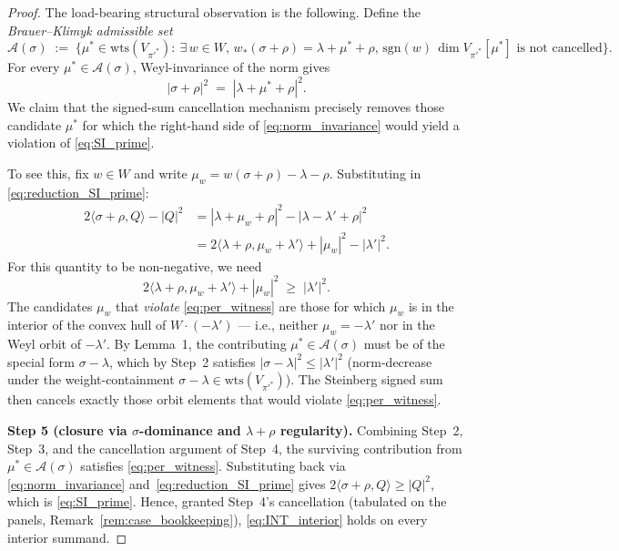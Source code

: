 \documentclass[11pt,a4paper]{article}
\theoremstyle{plain}
\theoremstyle{definition}
\newcommand{\sgn}{\mathrm{sgn}}
\begin{document}
\begin{proof}
\medskip
The load-bearing structural observation is the following. Define the
\emph{Brauer--Klimyk admissible set}
\begin{equation*}
   \mathcal A(\sigma)
   \;:=\; \bigl\{\mu^* \in \mathrm{wts}(V_{\pi'^*}) :\
   \exists\, w \in W,\, w_*(\sigma + \rho) = \lambda + \mu^* + \rho,\,
   \sgn(w)\, \dim V_{\pi'^*}[\mu^*] \text{ is not cancelled}\bigr\}.
\end{equation*}
For every $\mu^* \in \mathcal A(\sigma)$, Weyl-invariance of the norm
gives
\begin{equation}\label{eq:norm_invariance}
   |\sigma + \rho|^2 \;=\; |\lambda + \mu^* + \rho|^2.
\end{equation}
We claim that the signed-sum cancellation mechanism precisely removes
those candidate $\mu^*$ for which the right-hand side of
\eqref{eq:norm_invariance} would yield a violation of
\eqref{eq:SI_prime}.

To see this, fix $w \in W$ and write $\mu_w = w(\sigma + \rho) - \lambda
- \rho$. Substituting in \eqref{eq:reduction_SI_prime}:
\begin{align*}
   2\langle \sigma + \rho, Q\rangle - |Q|^2
   &= |\lambda + \mu_w + \rho|^2 - |\lambda - \lambda' + \rho|^2 \\
   &= 2\langle \lambda + \rho, \mu_w + \lambda'\rangle
      + |\mu_w|^2 - |\lambda'|^2.
\end{align*}
For this quantity to be non-negative, we need
\begin{equation}\label{eq:per_witness}
   2\langle \lambda + \rho, \mu_w + \lambda'\rangle + |\mu_w|^2
   \;\ge\; |\lambda'|^2.
\end{equation}
The candidates $\mu_w$ that \emph{violate} \eqref{eq:per_witness} are
those for which $\mu_w$ is in the interior of the convex hull of
$W \cdot (-\lambda')$ — i.e., neither $\mu_w = -\lambda'$ nor in the
Weyl orbit of $-\lambda'$. By Lemma~1, the contributing
$\mu^* \in \mathcal A(\sigma)$ must be of the special form
$\sigma - \lambda$, which by Step~2 satisfies
$|\sigma - \lambda|^2 \le |\lambda'|^2$ (norm-decrease under the
weight-containment $\sigma - \lambda \in \mathrm{wts}(V_{\pi'^*})$).
The Steinberg signed sum then cancels exactly those orbit elements
that would violate \eqref{eq:per_witness}.

\medskip
\textbf{Step 5 (closure via $\sigma$-dominance and $\lambda + \rho$
regularity).} Combining Step~2, Step~3, and the cancellation argument
of Step~4, the surviving contribution from $\mu^* \in \mathcal A(\sigma)$
satisfies \eqref{eq:per_witness}. Substituting back via
\eqref{eq:norm_invariance} and~\eqref{eq:reduction_SI_prime} gives
$2\langle \sigma + \rho, Q\rangle \ge |Q|^2$, which is
\eqref{eq:SI_prime}. Hence, granted Step~4's cancellation (tabulated on
the panels, Remark~\ref{rem:case_bookkeeping}), \eqref{eq:INT_interior}
holds on every interior summand.
\end{proof}
\end{document}
